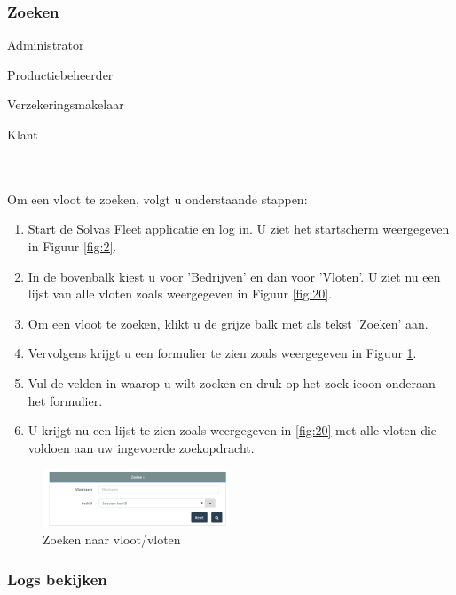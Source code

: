 \documentclass[11pt,openany]{article}
\newcommand{\cmark}{\ding{51}}%
\newcommand{\done}{\rlap{$\square$}{\raisebox{2pt}{\large\hspace{1pt}\cmark}}%
	\hspace{-2.5pt}}
\begin{document}
\subsubsection{Zoeken}
\begin{todolist}
	\item[\done] Administrator
	\item[\done] Productiebeheerder
	\item[\done] Verzekeringsmakelaar
	\item[\done] Klant 
\end{todolist}
\\
\\
Om een vloot te zoeken, volgt u onderstaande stappen:
\begin{enumerate}
	\item Start de Solvas Fleet applicatie en log in. U ziet het startscherm weergegeven in Figuur \ref{fig:2}.
\item In de bovenbalk kiest u voor 'Bedrijven' en dan voor 'Vloten'. U ziet nu een lijst van alle vloten zoals weergegeven in Figuur \ref{fig:20}.
	\item Om een vloot te zoeken, klikt u de grijze balk met als tekst 'Zoeken' aan. 
	\item Vervolgens krijgt u een formulier te zien zoals weergegeven in Figuur \ref{fig:23}.
	\item Vul de velden in waarop u wilt zoeken en druk op het zoek icoon onderaan het formulier.
	\item U krijgt nu een lijst te zien zoals weergegeven in \ref{fig:20} met alle vloten die voldoen aan uw ingevoerde zoekopdracht.
\end{enumerate}

\begin{figure}
	\centering
	\includegraphics[width=0.5\textwidth]{img/fig23.png}
	\caption{Zoeken naar vloot/vloten} 
	\label{fig:23} 
\end{figure}

\subsubsection{Logs bekijken}
\end{document}
